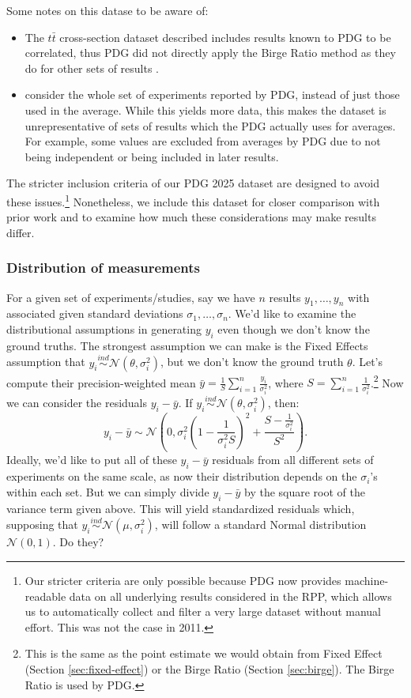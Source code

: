 \documentclass[letterpaper,12pt]{article}
\begin{document}
Some notes on this datase to be aware of:
\begin{itemize}
\item The $t\bar{t}$ cross-section dataset described includes results known to PDG to be correlated, thus PDG did not directly apply the Birge Ratio method as they do for other sets of results \citep{pdg2011topquark}.
\item \citet{baker2013meta} consider the whole set of experiments reported by PDG, instead of just those used in the average. While this yields more data, this makes the dataset is unrepresentative of sets of results which the PDG actually uses for averages. For example, some values are excluded from averages by PDG due to not being independent or being included in later results.
\end{itemize}
The stricter inclusion criteria of our PDG 2025 dataset are designed to avoid these issues.\footnote{Our stricter criteria are only possible because PDG now provides machine-readable data on all underlying results considered in the RPP, which allows us to automatically collect and filter a very large dataset without manual effort. This was not the case in 2011.} Nonetheless, we include this dataset for closer comparison with prior work and to examine how much these considerations may make results differ.


\subsubsection{Distribution of measurements}\label{distribution-of-measurements}

For a given set of experiments/studies, say we have $n$ results $y_1,\ldots,y_n$ with associated given standard deviations $\sigma_1,\ldots,\sigma_n$. We'd like to examine the distributional assumptions in generating $y_i$ even though we don't know the ground truths. The strongest assumption we can make is the Fixed Effects assumption that $y_i\overset{ind}{\sim}\mathcal{N}(\theta,\sigma_i^2)$, but we don't know the ground truth $\theta$. Let's compute their precision-weighted mean $\bar{y}=\frac{1}{S}\sum_{i=1}^n\frac{y_i}{\sigma_i^2}$, where $S=\sum_{i=1}^n \frac{1}{\sigma_i^2}$.\footnote{This is the same as the point estimate we would obtain from Fixed Effect (Section \ref{sec:fixed-effect}) or the Birge Ratio (Section \ref{sec:birge}). The Birge Ratio is used by PDG.} Now we can consider the residuals $y_i-\bar{y}$. If $y_i\overset{ind}{\sim}\mathcal{N}(\theta,\sigma_i^2)$, then:
\[y_i-\bar{y}\sim \mathcal{N}\left(0, \sigma_i^2\left(1-\frac{1}{\sigma_i^2S}\right)^2+\frac{S-\frac{1}{\sigma_i^2}}{S^2}\right).\]
Ideally, we'd like to put all of these $y_i-\bar{y}$ residuals from all different sets of experiments on the same scale, as now their distribution depends on the $\sigma_i$'s within each set. But we can simply divide $y_i-\bar{y}$ by the square root of the variance term given above. This will yield standardized residuals which, supposing that $y_i\overset{ind}{\sim} \mathcal{N}(\mu,\sigma_i^2)$, will follow a standard Normal distribution $\mathcal{N}(0,1)$. Do they?
\end{document}
